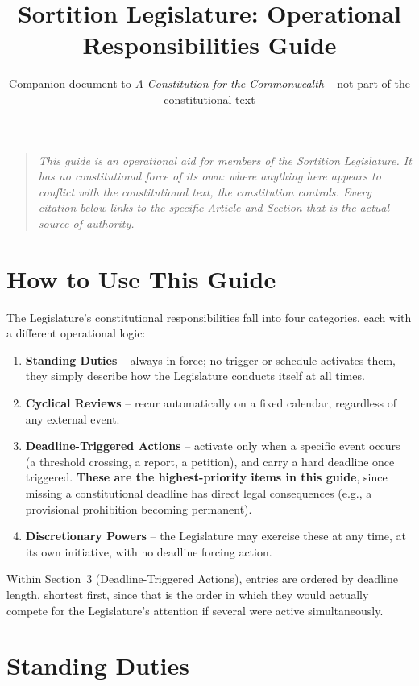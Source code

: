 \documentclass[11pt]{article}
\title{Sortition Legislature: Operational Responsibilities Guide}
\author{Companion document to \emph{A Constitution for the Commonwealth} -- not part of the constitutional text}
\date{}
\begin{document}
\maketitle

\begin{quote}
\itshape
This guide is an operational aid for members of the Sortition Legislature. It has no constitutional force of its own: where anything here appears to conflict with the constitutional text, the constitution controls. Every citation below links to the specific Article and Section that is the actual source of authority.
\end{quote}

\tableofcontents

\section{How to Use This Guide}

The Legislature's constitutional responsibilities fall into four categories, each with a different operational logic:

\begin{enumerate}
  \item \textbf{Standing Duties} -- always in force; no trigger or schedule activates them, they simply describe how the Legislature conducts itself at all times.
  \item \textbf{Cyclical Reviews} -- recur automatically on a fixed calendar, regardless of any external event.
  \item \textbf{Deadline-Triggered Actions} -- activate only when a specific event occurs (a threshold crossing, a report, a petition), and carry a hard deadline once triggered. \textbf{These are the highest-priority items in this guide}, since missing a constitutional deadline has direct legal consequences (e.g., a provisional prohibition becoming permanent).
  \item \textbf{Discretionary Powers} -- the Legislature may exercise these at any time, at its own initiative, with no deadline forcing action.
\end{enumerate}

Within Section~3 (Deadline-Triggered Actions), entries are ordered by deadline length, shortest first, since that is the order in which they would actually compete for the Legislature's attention if several were active simultaneously.

\section{Standing Duties}
\end{document}
